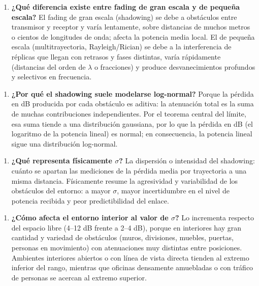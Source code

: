 \documentclass[11pt,a4paper]{article}
\begin{document}
\begin{enumerate}
  \item \textbf{¿Qué diferencia existe entre fading de gran escala y de pequeña escala?} El fading de gran escala (shadowing) se debe a obstáculos entre transmisor y receptor y varía lentamente, sobre distancias de muchos metros o cientos de longitudes de onda; afecta la potencia media local. El de pequeña escala (multitrayectoria, Rayleigh/Rician) se debe a la interferencia de réplicas que llegan con retrasos y fases distintas, varía rápidamente (distancias del orden de $\lambda$ o fracciones) y produce desvanecimientos profundos y selectivos en frecuencia.
\end{enumerate}

\begin{enumerate}
  \item \textbf{¿Por qué el shadowing suele modelarse log-normal?} Porque la pérdida en dB producida por cada obstáculo es aditiva: la atenuación total es la suma de muchas contribuciones independientes. Por el teorema central del límite, esa suma tiende a una distribución gaussiana, por lo que la pérdida en dB (el logaritmo de la potencia lineal) es normal; en consecuencia, la potencia lineal sigue una distribución log-normal.
\end{enumerate}

\begin{enumerate}
  \item \textbf{¿Qué representa físicamente $\sigma$?} La dispersión o intensidad del shadowing: cuánto se apartan las mediciones de la pérdida media por trayectoria a una misma distancia. Físicamente resume la agresividad y variabilidad de los obstáculos del entorno: a mayor $\sigma$, mayor incertidumbre en el nivel de potencia recibida y peor predictibilidad del enlace.
\end{enumerate}

\begin{enumerate}
  \item \textbf{¿Cómo afecta el entorno interior al valor de $\sigma$?} Lo incrementa respecto del espacio libre (4--12 dB frente a 2--4 dB), porque en interiores hay gran cantidad y variedad de obstáculos (muros, divisiones, muebles, puertas, personas en movimiento) con atenuaciones muy distintas entre posiciones. Ambientes interiores abiertos o con línea de vista directa tienden al extremo inferior del rango, mientras que oficinas densamente amuebladas o con tráfico de personas se acercan al extremo superior.
\end{enumerate}
\end{document}
